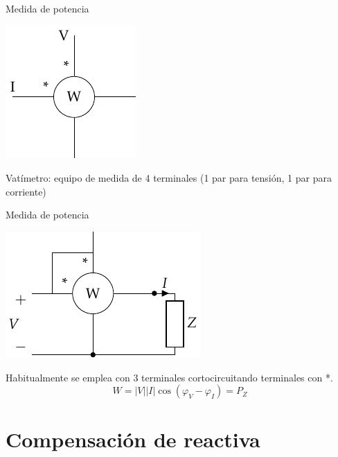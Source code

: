 \documentclass[aspectratio=169, usenames,svgnames,dvipsnames]{beamer}
\begin{document}
\begin{frame}[label={sec:orgdd35afc}]{Medida de potencia}
\begin{center}
\includegraphics[height=0.7\textheight]{../figs/vatimetro.pdf}
\end{center}

\alert{Vatímetro}: equipo de medida de 4 terminales (1 par para tensión, 1 par para corriente)
\end{frame}

\begin{frame}[label={sec:orgd6427b5}]{Medida de potencia}
\begin{center}
\includegraphics[height=0.5\textheight]{../figs/vatimetro_Z.pdf}
\end{center}


Habitualmente se emplea con 3 terminales cortocircuitando terminales con *.
\[
  \boxed{W = |V| |I| \cos(\varphi_V - \varphi_I) = P_Z}
\]
\end{frame}

\section{Compensación de reactiva}
\label{sec:org1785e1e}
\end{document}
